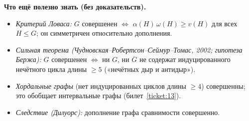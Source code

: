 \begin{tcolorbox}[colback=cbGrayBack,colframe=cbGray!55]
\textbf{Что ещё полезно знать (без доказательств).}
\begin{itemize}\tightlist
\item \emph{Критерий Ловаса:} \(G\) совершенен \(\iff\) \(\alpha(H)\,\omega(H)\ge v(H)\) для всех \(H\le G\);
  он симметричен относительно дополнения.
\item \emph{Сильная теорема (Чудновская–Робертсон–Сеймур–Томас, 2002; гипотеза Бержа):}
  \(G\) совершенен \(\iff\) ни \(G\), ни \(\overline G\) не содержат индуцированного нечётного цикла
  длины \(\ge5\) («нечётных дыр и антидыр»).
\item \emph{Хордальные графы} (нет индуцированных циклов длины \(\ge4\)) совершенны; это
  обобщает интервальные графы (билет~\ref{ticket:13}).
\item \emph{Следствие (Дилуорс):} дополнение графа сравнимости совершенно.
\end{itemize}
\end{tcolorbox}
